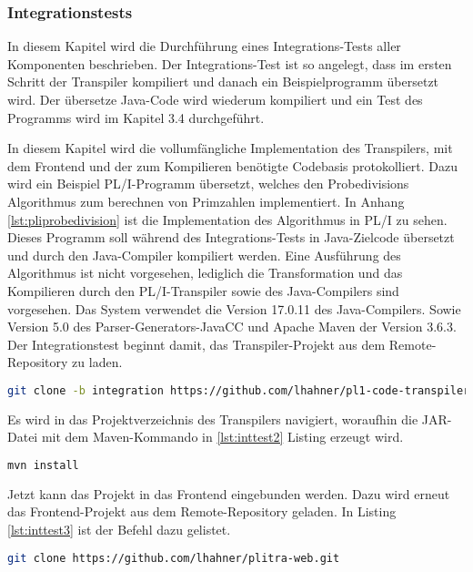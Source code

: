\subsubsection{Integrationstests}
In diesem Kapitel wird die Durchführung eines Integrations-Tests aller Komponenten beschrieben. Der Integrations-Test ist so angelegt, dass im ersten Schritt der Transpiler kompiliert und danach ein Beispielprogramm übersetzt wird. Der übersetze Java-Code wird wiederum kompiliert und ein Test des Programms wird im Kapitel 3.4 durchgeführt.

In diesem Kapitel wird die vollumfängliche Implementation des Transpilers, mit dem Frontend und der zum Kompilieren benötigte Codebasis protokolliert. Dazu wird ein Beispiel PL/I-Programm übersetzt, welches den Probedivisions Algorithmus zum berechnen von Primzahlen implementiert. 
In Anhang \ref{lst:pliprobedivision} ist die Implementation des Algorithmus in PL/I zu sehen. Dieses Programm soll während des Integrations-Tests in Java-Zielcode übersetzt und durch den Java-Compiler kompiliert werden.
Eine Ausführung des Algorithmus ist nicht vorgesehen, lediglich die Transformation und das Kompilieren durch den PL/I-Transpiler sowie des Java-Compilers sind vorgesehen. Das System verwendet die Version 17.0.11 des Java-Compilers. Sowie Version 5.0 des Parser-Generators-JavaCC und Apache Maven der Version 3.6.3. Der Integrationstest beginnt damit, das Transpiler-Projekt aus dem Remote-Repository zu laden.

\begin{lstlisting}[language=Bash, caption=Klonen des Transpilers, label={lst:inttest1}]
git clone -b integration https://github.com/lhahner/pl1-code-transpiler.git
\end{lstlisting} 

Es wird in das Projektverzeichnis des Transpilers navigiert, woraufhin die JAR-Datei mit dem Maven-Kommando in \ref{lst:inttest2} Listing erzeugt wird.

\begin{lstlisting}[language=Bash, caption=Erzeugen der JAR, label={lst:inttest2}]
mvn install
\end{lstlisting}

Jetzt kann das Projekt in das Frontend eingebunden werden. Dazu wird erneut das Frontend-Projekt aus dem Remote-Repository geladen. In Listing \ref{lst:inttest3} ist der Befehl dazu gelistet.

\begin{lstlisting}[language=Bash, caption=Klonen des Frontend-Projekts, label={lst:inttest3}]
git clone https://github.com/lhahner/plitra-web.git
\end{lstlisting}

